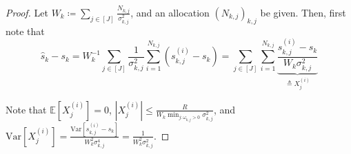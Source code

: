 \documentclass{article}
\newcommand{\E}{\mathbb{E}}
\newcommand{\Var}{\mathrm{Var}}
\theoremstyle{plain}
\theoremstyle{definition}
\theoremstyle{plain}
\begin{document}
\begin{proof}
    Let $W_k \coloneq \sum_{j \in [J]} \frac{N_{k,j}}{\sigma_{k,j}^2}$, and an allocation $(N_{k,j})_{k,j}$ be given.
    Then, first note that
    \begin{equation}
        \hat{s}_k - s_k = W_k^{-1} \sum_{j \in [J]} \frac{1}{\sigma_{k,j}^2} \sum_{i=1}^{N_{k,j}} (s_{k,j}^{(i)} - s_k) = \sum_{j \in [J]} \sum_{i=1}^{N_{k,j}} \underbrace{\frac{s_{k,j}^{(i)} - s_k}{W_k \sigma_{k,j}^2}}_{\triangleq X_j^{(i)}}
    \end{equation}
    
    Note that $\E[X_j^{(i)}] = 0$, $|X_j^{(i)}| \leq \frac{R}{W_k \min_{j : \omega_{k,j}>0} \sigma_{k,j}^2}$, and $\Var[X_j^{(i)}] = \frac{\Var[s_{k,j}^{(i)} - s_k]}{W_k^2 \sigma_{k,j}^4} = \frac{1}{W_k^2 \sigma_{k,j}^2}.$
    

\end{proof}
\end{document}
